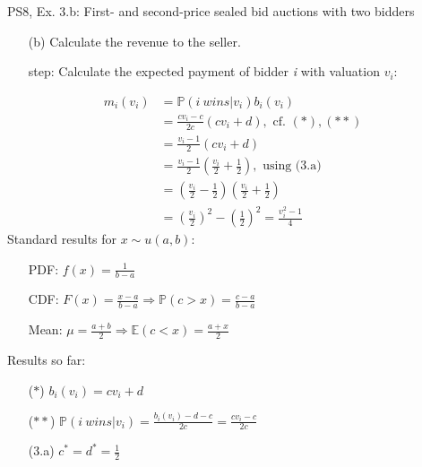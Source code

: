 \begin{frame}{PS8, Ex. 3.b: First- and second-price sealed bid auctions with two bidders}
    \begin{multicols}{2}
      \begin{itemize}
        \item[(b)] Calculate the revenue to the seller.
        \item[\nth{1} step:] Calculate the expected payment of bidder \textit{i} with valuation $v_i$:
      \end{itemize}
      \vspace{-6pt}
      \begin{align*}
        m_i(v_i)&=\mathbb{P}(i\ wins|v_i)b_i(v_i)\\
                &=\frac{cv_i-c}{2c}(cv_i+d),\text{ cf. }(*),(**)\\
                &=\frac{v_i-1}{2}(cv_i+d)\\
                &=\frac{v_i-1}{2}\left(\frac{v_i}{2}+\frac{1}{2}\right),\text{ using (3.a)}\\
                &=\left(\frac{v_i}{2}-\frac{1}{2}\right)\left(\frac{v_i}{2}+\frac{1}{2}\right)\\
                &=\left(\frac{v_i}{2}\right)^2-\left(\frac{1}{2}\right)^2
                 =\frac{v_i^2-1}{4}
      \end{align*}
      \vfill\null\columnbreak
      Standard results for $x\sim u(a, b):$
      \vspace{-6pt}
      \begin{enumerate}
        \item[PDF:] $f(x)=\frac{1}{b-a}$
        \item[CDF:] $F(x)=\frac{x-a}{b-a}\Rightarrow\mathbb{P}(c>x)=\frac{c-a}{b-a}$
        \item[Mean:] $\mu=\frac{a+b}{2}\Rightarrow\mathbb{E}(c<x)=\frac{a+x}{2}$
      \end{enumerate}
      \vspace{-6pt}
      Results so far:
      \vspace{-6pt}
      \begin{itemize}
        \item[($*$)]  $b_i(v_i) = cv_i+d$
        \item[($**$)] $\mathbb{P}(i\ wins|v_i)=\frac{b_i(v_i)-d-c}{2c}=\frac{cv_i-c}{2c}$
        \item[(3.a)]    $c^*=d^*=\frac{1}{2}$
      \end{itemize}
      \vfill\null
    \end{multicols}
\end{frame}
